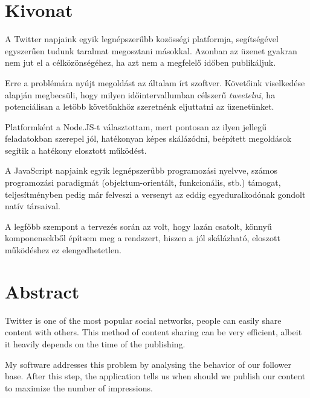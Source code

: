 \chapter*{Kivonat}

A Twitter napjaink egyik legnépszerűbb kozösségi platformja, segítségével
egyszerűen tudunk taralmat megosztani másokkal. Azonban az üzenet gyakran
nem jut el a célközönségéhez, ha azt nem a megfelelő időben publikáljuk.

Erre a problémára nyújt megoldást az általam írt szoftver. Követőink
viselkedése alapján megbecsüli, hogy milyen időintervallumban célszerű
\emph{tweetelni}, ha potenciálisan a letöbb követőnkhöz szeretnénk eljuttatni
az üzenetünket.

Platformként a Node.JS-t választottam, mert pontosan az ilyen jellegű
feladatokban szerepel jól, hatékonyan képes skálázódni, beépített megoldások
segítik a hatékony elosztott működést.

A JavaScript napjaink egyik legnépszerűbb programozási nyelvve, számos
programozási paradigmát (objektum-orientált, funkcionális, stb.) támogat,
teljesítményben pedig már felveszi a versenyt az eddig egyeduralkodónak
gondolt natív társaival.

A legfőbb szempont a tervezés során az volt, hogy lazán csatolt, könnyű
komponensekből építsem meg a rendszert, hiszen a jól skálázható, eloszott
működéshez ez elengedhetetlen.

\vfill


\chapter*{Abstract}

Twitter is one of the most popular social networks, people can
easily share content with others. This method of content sharing can be very
efficient, albeit it heavily depends on the time of the publishing.

My software addresses this problem by analysing the behavior of our follower
base. After this step, the application tells us when should we publish our
content to maximize the number of impressions.


